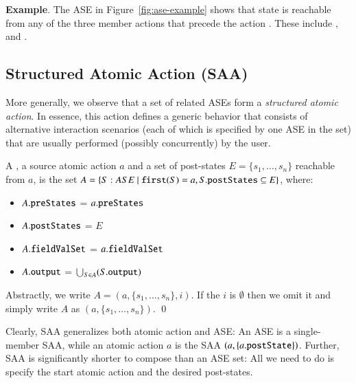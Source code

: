 {\noindent\textbf{Example}. The ASE in Figure~\ref{fig:ase-example} shows that state  is reachable from any of the three member actions that precede the action . These include ,  and . 

\subsection{Structured Atomic Action (SAA)} \label{sect:arch-saa}

More generally, we observe that a set of related ASEs form a \textit{structured atomic action}. In essence, this action defines a generic behavior that consists of alternative interaction scenarios (each of which is specified by one ASE in the set) that are usually performed (possibly concurrently) by the user.
%
\begin{definition} \label{def:saa}
	A , \wrt a source atomic action $ a $ and a set of post-states $ E = \{ s_{1},\dots,s_{n} \} $ reachable from $a$, is the set $ A = \{S: ASE ~|~ \func{first}(S) = a, S.\attribn{postStates} \subseteq E \} $, where:
  \begin{itemize}
  \item $A.{\tt preStates}$ = $a.{\tt preStates}$
  \item $A.{\tt postStates}$ = $E$
  \item $A.{\tt fieldValSet}$ = $a.{\tt fieldValSet}$
  \item $A.{\tt output}$ = $\bigcup_{S \in A} (S.{\tt output})$
  \end{itemize}

  Abstractly, we write $ A = (a, \{ s_{1},\dots,s_{n} \}, i) $. If the  $i$ is $\emptyset$ then we omit it and simply write $A$ as $(a, \{ s_{1},\dots,s_{n} \})$. \qed
\end{definition}

Clearly, SAA generalizes both atomic action and ASE: An ASE is a single-member SAA, while an atomic action $ a $ is the SAA 
%
$ (a, \{ a.{\tt postState} \}) $.
%
Further, SAA is significantly shorter to compose than an ASE set: All we need to do is specify the start atomic action and the desired post-states.

}
